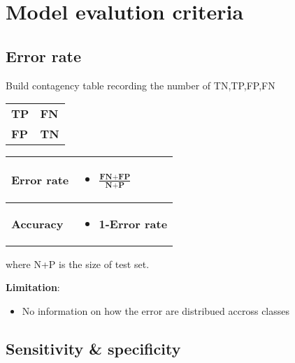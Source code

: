 \section{Model evalution criteria}
\subsection{Error rate}
Build contagency table recording the number of TN,TP,FP,FN
  \begin{table}[!h]
    \begin{center}
    \begin{tabular}{| m{5em}| m{5em}|}
    \hline
    \centering
    \cellcolor{vert.g} \textbf{TP} &  \cellcolor{red.g}\textbf{FN} \\ \centering \hline 
    \centering
    \cellcolor{red.g} \textbf{FP}  & \cellcolor{vert.g} \textbf{TN}
    \end{tabular}
    \end{center}
\end{table}



  \begin{table}[!h]
    \begin{center}
    \begin{tabular}{| m{5em}| m{8em}|}
    \hline
    \centering
    \rowcolor{vert.g} \textbf{Error rate} & \begin{itemize}
        \item $\frac{\textbf{FN+FP}}{\textbf{N+P}}$ 
    \end{itemize}  \\ \hline 
    \centering
    \rowcolor{red.g} \textbf{Accuracy}  &  \begin{itemize}
        \item \textbf{1-Error rate}
    \end{itemize}
    \end{tabular}
    \end{center}
\end{table}
where N+P is the size of test set.

\textbf{Limitation}:
\begin{itemize}
    \item No information on how the error are distribued accross classes
\end{itemize}
\subsection{Sensitivity \& specificity}

